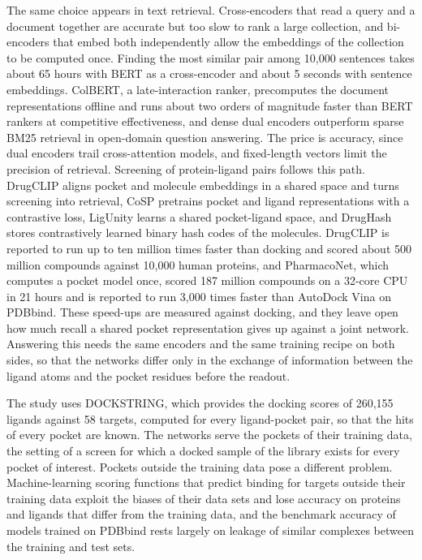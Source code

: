 The same choice appears in text retrieval. Cross-encoders that read a query and a document together are accurate but too slow to rank a large collection, and bi-encoders that embed both independently allow the embeddings of the collection to be computed once.\cite{humeau2020} Finding the most similar pair among 10{,}000 sentences takes about 65 hours with BERT as a cross-encoder and about 5 seconds with sentence embeddings.\cite{reimers2019} ColBERT, a late-interaction ranker, precomputes the document representations offline and runs about two orders of magnitude faster than BERT rankers at competitive effectiveness,\cite{khattab2020} and dense dual encoders outperform sparse BM25 retrieval in open-domain question answering.\cite{karpukhin2020} The price is accuracy, since dual encoders trail cross-attention models,\cite{menon2022} and fixed-length vectors limit the precision of retrieval.\cite{luan2021}
Screening of protein-ligand pairs follows this path. DrugCLIP aligns pocket and molecule embeddings in a shared space and turns screening into retrieval,\cite{drugclip_arxiv,drugclip} CoSP pretrains pocket and ligand representations with a contrastive loss,\cite{gao2023} LigUnity learns a shared pocket-ligand space,\cite{ligunity2025} and DrugHash stores contrastively learned binary hash codes of the molecules.\cite{han2025} DrugCLIP is reported to run up to ten million times faster than docking and scored about 500 million compounds against 10,000 human proteins,\cite{drugclip} and PharmacoNet, which computes a pocket model once, scored 187 million compounds on a 32-core CPU in 21 hours and is reported to run 3,000 times faster than AutoDock Vina on PDBbind.\cite{pharmaconet} These speed-ups are measured against docking, and they leave open how much recall a shared pocket representation gives up against a joint network. Answering this needs the same encoders and the same training recipe on both sides, so that the networks differ only in the exchange of information between the ligand atoms and the pocket residues before the readout.

The study uses DOCKSTRING, which provides the docking scores of 260,155 ligands against 58 targets,\cite{dockstring} computed for every ligand-pocket pair, so that the hits of every pocket are known. The networks serve the pockets of their training data, the setting of a screen for which a docked sample of the library exists for every pocket of interest. Pockets outside the training data pose a different problem. Machine-learning scoring functions that predict binding for targets outside their training data exploit the biases of their data sets and lose accuracy on proteins and ligands that differ from the training data,\cite{chen2019,yang2020,volkov2022} and the benchmark accuracy of models trained on PDBbind rests largely on leakage of similar complexes between the training and test sets.\cite{graber2025}

